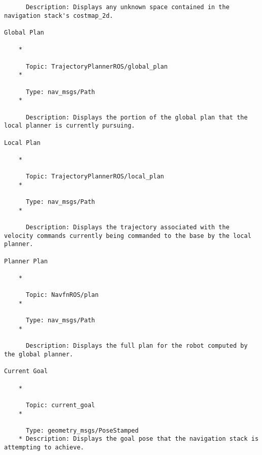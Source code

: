 \begin{verbatim}
      Description: Displays any unknown space contained in the navigation stack's costmap_2d. 

Global Plan

    *

      Topic: TrajectoryPlannerROS/global_plan
    *

      Type: nav_msgs/Path
    *

      Description: Displays the portion of the global plan that the local planner is currently pursuing. 

Local Plan

    *

      Topic: TrajectoryPlannerROS/local_plan
    *

      Type: nav_msgs/Path
    *

      Description: Displays the trajectory associated with the velocity commands currently being commanded to the base by the local planner. 

Planner Plan

    *

      Topic: NavfnROS/plan
    *

      Type: nav_msgs/Path
    *

      Description: Displays the full plan for the robot computed by the global planner. 

Current Goal

    *

      Topic: current_goal
    *

      Type: geometry_msgs/PoseStamped
    * Description: Displays the goal pose that the navigation stack is attempting to achieve. 
\end{verbatim}

